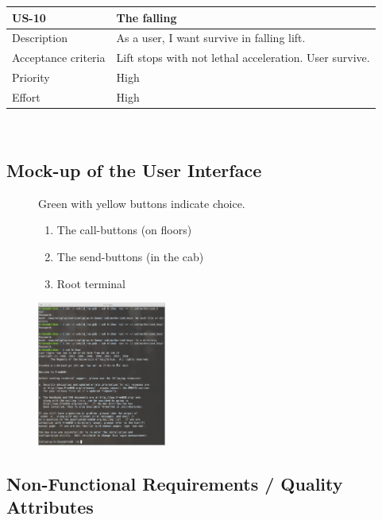 \documentclass[a4paper,11pt]{article}
\begin{document}
\noindent\begin{tabularx}{\textwidth}{|C{2cm}|Y|}
  \hline
  \textbf{US-10} & \textbf{The falling}\\
  \hline
  Description &
  As a user, I want survive in falling lift.
  \\
  \hline
  Acceptance criteria &
  Lift stops with not lethal acceleration. User survive.
  \\
  \hline
  Priority & High\\
  \hline
  Effort & High\\
  \hline
\end{tabularx}\\

\newpage
\subsection{Mock-up of the User Interface}
\label{sub:Mock-up of the User Interface}
\begin{figure}[h!]
  \begin{figure}
    \vspace{-15pt}
    
  \end{figure}
  Green with yellow buttons indicate choice.
  \begin{enumerate}[label=(\alph*)]
  \item The call-buttons (on floors)
  \item The send-buttons (in the cab)
  \item Root terminal
  \end{enumerate}
  \includegraphics[width=120pt]{root}
\end{figure}

\subsection{Non-Functional Requirements / Quality Attributes}
\label{sub:Non-Functional Requirements / Quality Attributes}
\end{document}
